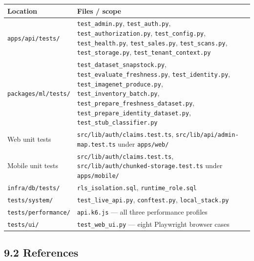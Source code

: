 \documentclass[
  11pt,
]{article}
\newcounter{none} %
\begin{document}
{\def\LTcaptype{none} %
\begin{longtable}[]{@{}
  >{\raggedright\arraybackslash}p{}
  >{\raggedright\arraybackslash}p{}@{}}
\toprule\noalign{}
\begin{minipage}[b]{\linewidth}\raggedright
Location
\end{minipage} & \begin{minipage}[b]{\linewidth}\raggedright
Files / scope
\end{minipage} \\
\midrule\noalign{}
\endhead
\bottomrule\noalign{}
\endlastfoot
\texttt{apps/api/tests/} & \texttt{test\_admin.py},
\texttt{test\_auth.py}, \texttt{test\_authorization.py},
\texttt{test\_config.py}, \texttt{test\_health.py},
\texttt{test\_sales.py}, \texttt{test\_scans.py},
\texttt{test\_storage.py}, \texttt{test\_tenant\_context.py} \\
\texttt{packages/ml/tests/} & \texttt{test\_dataset\_snapstock.py},
\texttt{test\_evaluate\_freshness.py}, \texttt{test\_identity.py},
\texttt{test\_imagenet\_produce.py}, \texttt{test\_inventory\_batch.py},
\texttt{test\_prepare\_freshness\_dataset.py},
\texttt{test\_prepare\_identity\_dataset.py},
\texttt{test\_stub\_classifier.py} \\
Web unit tests & \texttt{src/lib/auth/claims.test.ts},
\texttt{src/lib/api/admin-map.test.ts} under \texttt{apps/web/} \\
Mobile unit tests & \texttt{src/lib/auth/claims.test.ts},
\texttt{src/lib/auth/chunked-storage.test.ts} under
\texttt{apps/mobile/} \\
\texttt{infra/db/tests/} & \texttt{rls\_isolation.sql},
\texttt{runtime\_role.sql} \\
\texttt{tests/system/} & \texttt{test\_live\_api.py},
\texttt{conftest.py}, \texttt{local\_stack.py} \\
\texttt{tests/performance/} & \texttt{api.k6.js} --- all three
performance profiles \\
\texttt{tests/ui/} & \texttt{test\_web\_ui.py} --- eight Playwright
browser cases \\
\end{longtable}
}

\subsection{9.2 References}\label{references}
\end{document}
